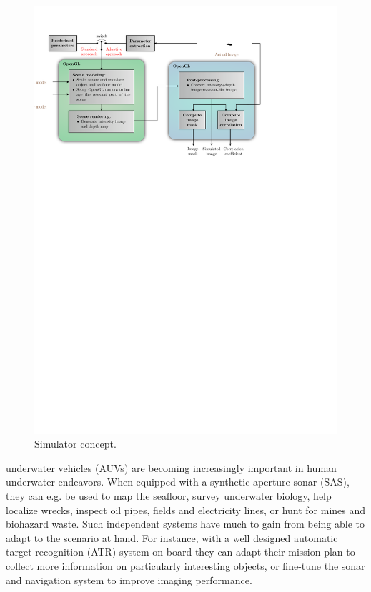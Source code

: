 \begin{figure}[t]\centering%
\includegraphics[drawing,width=\linewidth]{gfx/simulator.svg}%
\caption{Simulator concept.}\label{buildup}%
\end{figure}



 underwater vehicles (AUVs) are becoming increasingly important in human underwater endeavors. When equipped with a synthetic aperture sonar (SAS), they can e.g. be used to map the seafloor, survey underwater biology, help localize wrecks, inspect oil pipes, fields and electricity lines, or hunt for mines and biohazard waste. Such independent systems have much to gain from being able to adapt to the scenario at hand. For instance, with a well designed automatic target recognition (ATR) system on board they can adapt their mission plan to collect more information on particularly interesting objects, or fine-tune the sonar and navigation system to improve imaging performance.
 
